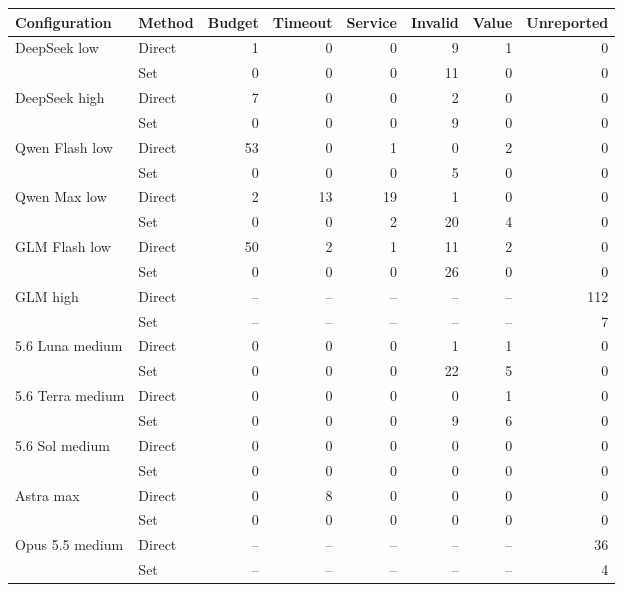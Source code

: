 \begin{tabular}{@{}llrrrrrr@{}}
\toprule
Configuration & Method & Budget & Timeout & Service & Invalid & Value & Unreported\\
\midrule
DeepSeek low & Direct & 1 & 0 & 0 & 9 & 1 & 0\\
 & Set & 0 & 0 & 0 & 11 & 0 & 0\\
DeepSeek high & Direct & 7 & 0 & 0 & 2 & 0 & 0\\
 & Set & 0 & 0 & 0 & 9 & 0 & 0\\
Qwen Flash low & Direct & 53 & 0 & 1 & 0 & 2 & 0\\
 & Set & 0 & 0 & 0 & 5 & 0 & 0\\
Qwen Max low & Direct & 2 & 13 & 19 & 1 & 0 & 0\\
 & Set & 0 & 0 & 2 & 20 & 4 & 0\\
GLM Flash low & Direct & 50 & 2 & 1 & 11 & 2 & 0\\
 & Set & 0 & 0 & 0 & 26 & 0 & 0\\
GLM high & Direct & -- & -- & -- & -- & -- & 112\\
 & Set & -- & -- & -- & -- & -- & 7\\
5.6 Luna medium & Direct & 0 & 0 & 0 & 1 & 1 & 0\\
 & Set & 0 & 0 & 0 & 22 & 5 & 0\\
5.6 Terra medium & Direct & 0 & 0 & 0 & 0 & 1 & 0\\
 & Set & 0 & 0 & 0 & 9 & 6 & 0\\
5.6 Sol medium & Direct & 0 & 0 & 0 & 0 & 0 & 0\\
 & Set & 0 & 0 & 0 & 0 & 0 & 0\\
Astra max & Direct & 0 & 8 & 0 & 0 & 0 & 0\\
 & Set & 0 & 0 & 0 & 0 & 0 & 0\\
Opus 5.5 medium & Direct & -- & -- & -- & -- & -- & 36\\
 & Set & -- & -- & -- & -- & -- & 4\\
\bottomrule
\end{tabular}
